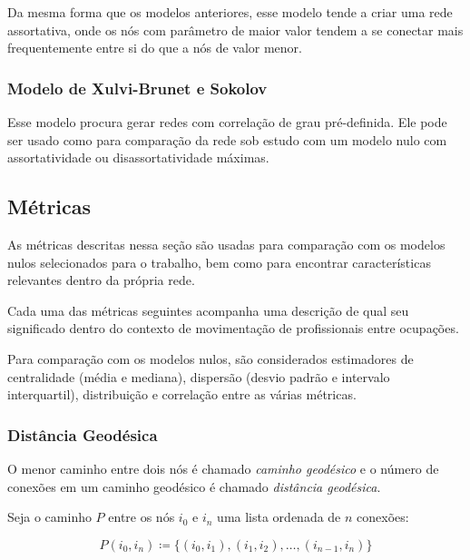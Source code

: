 \documentclass[12pt,a4paper]{article}
\theoremstyle{hypo}
\newcommand{\defn}{\coloneqq} %
\begin{document}
Da mesma forma que os modelos anteriores, esse modelo tende a criar uma rede assortativa, onde os nós com parâmetro de maior valor tendem a se conectar mais frequentemente entre si do que a nós de valor menor.

\subsubsection{Modelo de Xulvi-Brunet e Sokolov}

Esse modelo procura gerar redes com correlação de grau pré-definida. Ele pode ser usado como para comparação da rede sob estudo com um modelo nulo com assortatividade ou disassortatividade máximas. 

\subsection{Métricas}

As métricas descritas nessa seção são usadas para comparação com os modelos nulos selecionados para o trabalho, bem como para encontrar características relevantes dentro da própria rede.

Cada uma das métricas seguintes acompanha uma descrição de qual seu significado dentro do contexto de movimentação de profissionais entre ocupações.

Para comparação com os modelos nulos, são considerados estimadores de centralidade (média e mediana), dispersão (desvio padrão e intervalo interquartil), distribuição e correlação entre as várias métricas.

\subsubsection{Distância Geodésica} \label{sec:distancia-geodesica}

O menor caminho entre dois nós é chamado \textit{caminho geodésico} e o número de conexões em um caminho geodésico é chamado \textit{distância geodésica}.

Seja o caminho $P$ entre os nós $i_0$ e $i_n$ uma lista ordenada de $n$ conexões:

\begin{equation} \label{eq:caminho}
P(i_0,i_n) \defn \{(i_0,i_1), (i_1,i_2), \ldots, (i_{n-1},i_n)\}
\end{equation}
\end{document}
